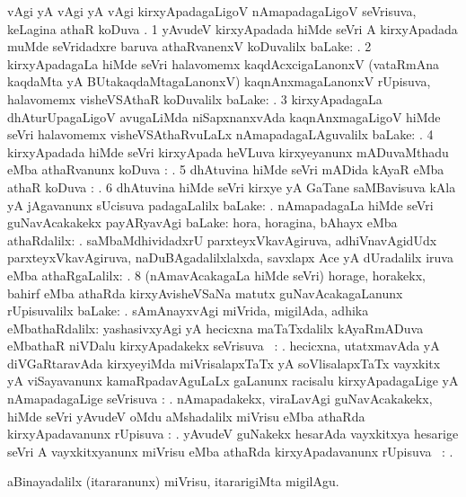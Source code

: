 \bentry
{}
\gl{\pUparx}
\bmng
\kirxvi vAgi yA \gu vAgi yA \upa vAgi kirxyApadagaLigoV nAmapadagaLigoV seVrisuva, keLagina athaR koDuva \pUparx. 
\bnum
\num{1} yAvudeV kirxyApadada hiMde seVri A kirxyApadada muMde seVridadxre baruva athaRvanenxV koDuvalilx baLake: . 
\num{2} kirxyApadagaLa hiMde seVri halavomemx kaqdAcxcigaLanonxV (vataRmAna kaqdaMta yA BUtakaqdaMtagaLanonxV) kaqnAnxmagaLanonxV rUpisuva, halavomemx visheVSAthaR koDuvalilx baLake: . 
\num{3} kirxyApadagaLa dhAturUpagaLigoV avugaLiMda niSapxnanxvAda kaqnAnxmagaLigoV hiMde seVri halavomemx visheVSAthaRvuLaLx nAmapadagaLAguvalilx baLake: . 
\num{4} kirxyApadada hiMde seVri kirxyApada heVLuva kirxyeyanunx mADuvaMthadu eMba athaRvanunx koDuva \pUparx: . 
\num{5} dhAtuvina hiMde seVri mADida kAyaR eMba athaR koDuva \pUparx: . 
\num{6} dhAtuvina hiMde seVri kirxye yA GaTane saMBavisuva kAla yA jAgavanunx sUcisuva padagaLalilx baLake: . 
 nAmapadagaLa hiMde seVri guNavAcakakekx payARyavAgi baLake: 
\banum
{} hora, horagina, bAhayx eMba athaRdalilx: . 
 saMbaMdhividadxrU parxteyxVkavAgiruva, adhiVnavAgidUdx parxteyxVkavAgiruva, naDuBAgadalilxlalxda, savxlapx Ace yA dUradalilx iruva eMba athaRgaLalilx: . 
\eanum
\numie
\num{8} (nAmavAcakagaLa hiMde seVri) horage, horakekx, bahirf eMba athaRda kirxyAvisheVSaNa matutx guNavAcakagaLanunx rUpisuvalilx baLake: . 
 sAmAnayxvAgi miVrida, migilAda, adhika eMbathaRdalilx: 
\banum
{} yashasivxyAgi yA hecicxna maTaTxdalilx kAyaRmADuva eMbathaR niVDalu kirxyApadakekx seVrisuva \pUparx\ : . 
 hecicxna, utatxmavAda yA diVGaRtaravAda kirxyeyiMda miVrisalapxTaTx yA soVlisalapxTaTx vayxkitx yA viSayavanunx kamaRpadavAguLaLx \sakirx gaLanunx racisalu kirxyApadagaLige yA nAmapadagaLige seVrisuva \pUparx: . 
 nAmapadakekx, viraLavAgi guNavAcakakekx, hiMde seVri yAvudeV oMdu aMshadalilx miVrisu eMba athaRda kirxyApadavanunx rUpisuva \pUparx: . 
 yAvudeV guNakekx hesarAda vayxkitxya hesarige seVri A vayxkitxyanunx miVrisu eMba athaRda kirxyApadavanunx rUpisuva \pUparx\ : . 
\eanum
\numie
\enum
\emng
\eentry

\bentry
{}
\gl{\sakirx}
\bmng
aBinayadalilx (itararanunx) miVrisu, itararigiMta migilAgu. 
\emng
\eentry

